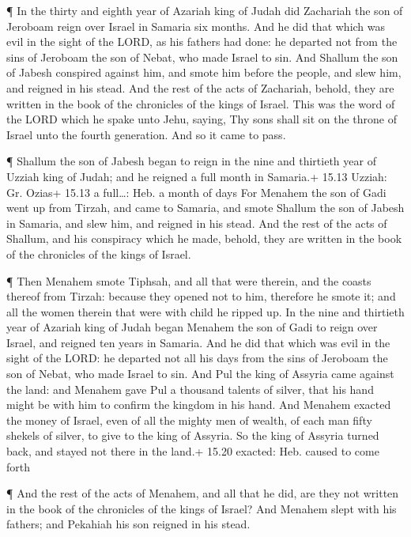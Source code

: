  ¶ In the thirty and eighth year of Azariah king of Judah
did Zachariah the son of Jeroboam reign over Israel in Samaria six
months.  And he did that which was evil in the sight of the
LORD, as his fathers had done: he departed not from the sins of Jeroboam
the son of Nebat, who made Israel to sin.  And Shallum the
son of Jabesh conspired against him, and smote him before the people,
and slew him, and reigned in his stead.  And the rest of
the acts of Zachariah, behold, they are written in the book of the
chronicles of the kings of Israel.  This was the word of
the LORD which he spake unto Jehu, saying, Thy sons shall sit on the
throne of Israel unto the fourth generation. And so it came to pass.

 ¶ Shallum the son of Jabesh began to reign in the nine and
thirtieth year of Uzziah king of Judah; and he reigned a full month in
Samaria.+ 15.13 Uzziah: Gr. Ozias+ 15.13 a full\ldots: Heb. a month of
days  For Menahem the son of Gadi went up from Tirzah, and
came to Samaria, and smote Shallum the son of Jabesh in Samaria, and
slew him, and reigned in his stead.  And the rest of the
acts of Shallum, and his conspiracy which he made, behold, they are
written in the book of the chronicles of the kings of Israel.

 ¶ Then Menahem smote Tiphsah, and all that were therein,
and the coasts thereof from Tirzah: because they opened not to him,
therefore he smote it; and all the women therein that were with child he
ripped up.  In the nine and thirtieth year of Azariah king
of Judah began Menahem the son of Gadi to reign over Israel, and reigned
ten years in Samaria.  And he did that which was evil in
the sight of the LORD: he departed not all his days from the sins of
Jeroboam the son of Nebat, who made Israel to sin.  And Pul
the king of Assyria came against the land: and Menahem gave Pul a
thousand talents of silver, that his hand might be with him to confirm
the kingdom in his hand.  And Menahem exacted the money of
Israel, even of all the mighty men of wealth, of each man fifty shekels
of silver, to give to the king of Assyria. So the king of Assyria turned
back, and stayed not there in the land.+ 15.20 exacted: Heb. caused to
come forth

 ¶ And the rest of the acts of Menahem, and all that he
did, are they not written in the book of the chronicles of the kings of
Israel?  And Menahem slept with his fathers; and Pekahiah
his son reigned in his stead.

